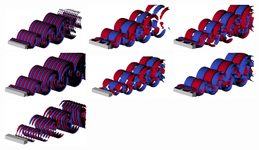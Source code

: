 \documentclass{jfm}
\begin{document}
\begin{figure}
  \includegraphics[width=0.32\textwidth]{./fig/AR1s/Floqetmode_beta_5p5_Re200_AR1_B.png}
  \includegraphics[width=0.32\textwidth]{./fig/AR1s/Floqetmode_beta_1p25_Re200_AR1p25_A.png}
  \includegraphics[width=0.32\textwidth]{./fig/AR1s/Floqetmode_beta_1p25_Re200_AR1p25_Bp.png}
  \includegraphics[width=0.32\textwidth]{./fig/AR1s/Floqetmode_beta_5p5_Re200_AR1p25_B.png}
  \includegraphics[width=0.32\textwidth]{./fig/AR1s/Floqetmode_beta_1p8_Re200_AR1p5_A.png}
  \includegraphics[width=0.32\textwidth]{./fig/AR1s/Floqetmode_beta_1p8_Re200_AR1p5_Bp.png}
  \includegraphics[width=0.32\textwidth]{./fig/AR1s/Floqetmode_beta_3p75_Re200_AR1p5_C.png}

\end{figure}
\end{document}
